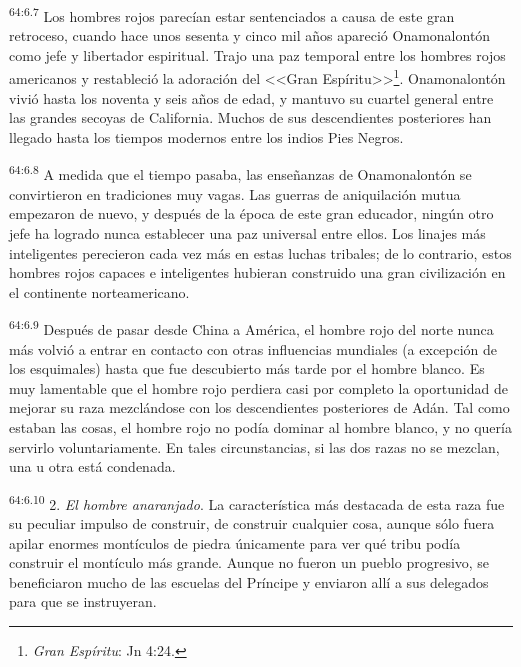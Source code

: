 \par
\textsuperscript{64:6.7} Los hombres rojos parecían estar sentenciados a causa de este gran retroceso, cuando hace unos sesenta y cinco mil años apareció Onamonalontón como jefe y libertador espiritual. Trajo una paz temporal entre los hombres rojos americanos y restableció la adoración del <<Gran Espíritu>>\footnote{\textit{Gran Espíritu}: Jn 4:24.}. Onamonalontón vivió hasta los noventa y seis años de edad, y mantuvo su cuartel general entre las grandes secoyas de California. Muchos de sus descendientes posteriores han llegado hasta los tiempos modernos entre los indios Pies Negros.

\par
\textsuperscript{64:6.8} A medida que el tiempo pasaba, las enseñanzas de Onamonalontón se convirtieron en tradiciones muy vagas. Las guerras de aniquilación mutua empezaron de nuevo, y después de la época de este gran educador, ningún otro jefe ha logrado nunca establecer una paz universal entre ellos. Los linajes más inteligentes perecieron cada vez más en estas luchas tribales; de lo contrario, estos hombres rojos capaces e inteligentes hubieran construido una gran civilización en el continente norteamericano.

\par
\textsuperscript{64:6.9} Después de pasar desde China a América, el hombre rojo del norte nunca más volvió a entrar en contacto con otras influencias mundiales (a excepción de los esquimales) hasta que fue descubierto más tarde por el hombre blanco. Es muy lamentable que el hombre rojo perdiera casi por completo la oportunidad de mejorar su raza mezclándose con los descendientes posteriores de Adán. Tal como estaban las cosas, el hombre rojo no podía dominar al hombre blanco, y no quería servirlo voluntariamente. En tales circunstancias, si las dos razas no se mezclan, una u otra está condenada.

\par
\textsuperscript{64:6.10} 2. \textit{El hombre anaranjado}. La característica más destacada de esta raza fue su peculiar impulso de construir, de construir cualquier cosa, aunque sólo fuera apilar enormes montículos de piedra únicamente para ver qué tribu podía construir el montículo más grande. Aunque no fueron un pueblo progresivo, se beneficiaron mucho de las escuelas del Príncipe y enviaron allí a sus delegados para que se instruyeran.

